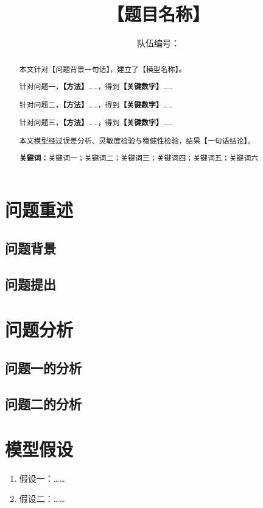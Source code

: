 \documentclass[12pt,a4paper]{ctexart}
\title{【题目名称】}
\author{队伍编号：\underline{\hspace{3cm}}}
\date{}
\begin{document}
\maketitle

\begin{abstract}
\noindent 本文针对【问题背景一句话】，建立了【模型名称】。

针对问题一，\textbf{【方法】}……，得到\textbf{【关键数字】}……

针对问题二，\textbf{【方法】}……，得到\textbf{【关键数字】}……

针对问题三，\textbf{【方法】}……，得到\textbf{【关键数字】}……

本文模型经过误差分析、灵敏度检验与稳健性检验，结果【一句话结论】。

\vspace{0.6em}
\noindent\textbf{关键词：}关键词一；关键词二；关键词三；关键词四；关键词五；关键词六
\end{abstract}

\newpage

\section{问题重述}
\subsection{问题背景}
\subsection{问题提出}

\section{问题分析}
\subsection{问题一的分析}
\subsection{问题二的分析}

\section{模型假设}
\begin{enumerate}[label=(\arabic*)]
    \item 假设一：……
    \item 假设二：……
\end{enumerate}
\end{document}
